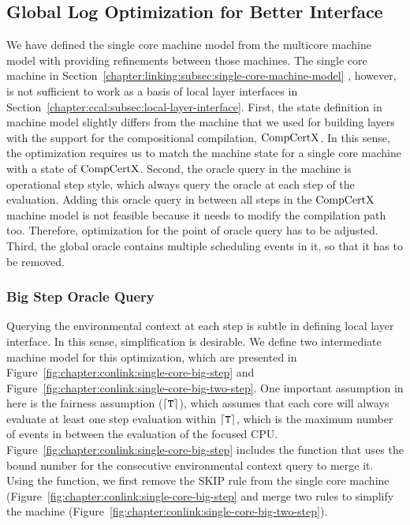 
\subsection{Global Log Optimization for Better Interface}
\label{chapter:linking:subsec:global-log-optimization}

We have defined the single core machine model from the multicore machine model with providing refinements between those machines. 
The single core machine in Section~\ref{chapter:linking:subsec:single-core-machine-model} , however, 
is not sufficient to work as a 
basis of local layer interfaces in Section~\ref{chapter:ccal:subsec:local-layer-interface}.
First, the state definition in machine model slightly differs from the machine that we used for building layers with the support for the compositional compilation, $\mathrm{CompCertX}$. 
In this sense, the optimization requires us to match the machine state for a single core machine with a state of $\mathrm{CompCertX}$. 
Second, the oracle query in the machine is operational step style, 
which always query the oracle at each step of the evaluation.
Adding this oracle query in between all steps in the $\mathrm{CompCertX}$ machine model is not feasible because it needs to modify the compilation path too. 
Therefore, 
optimization for the point of oracle query has to be adjusted. 
Third, the global oracle contains multiple scheduling events in it, 
so that it has to be removed.

\subsubsection{Big Step Oracle Query}



Querying the environmental context at each step is subtle in defining local layer interface. 
In this sense, simplification is desirable. 
We define two intermediate machine model for this optimization,
which are presented in Figure~\ref{fig:chapter:conlink:single-core-big-step} and Figure~\ref{fig:chapter:conlink:single-core-big-two-step}.
One important assumption in here is the fairness assumption (${\lceil{{\mathrm{\texttt{T}}}}\rceil}$),
which assumes that each core will always evaluate at least one step evaluation within ${\lceil{{\mathrm{\texttt{T}}}}\rceil}$, which is the maximum number
of events in between the evaluation of the focused CPU. 
Figure~\ref{fig:chapter:conlink:single-core-big-step} includes the function 
that uses the bound number for the consecutive environmental context query 
to merge it. 
Using the function, we first remove the \textsf{SKIP} rule from the single core machine (Figure~\ref{fig:chapter:conlink:single-core-big-step}
and merge two rules to simplify the machine (Figure~\ref{fig:chapter:conlink:single-core-big-two-step}).

